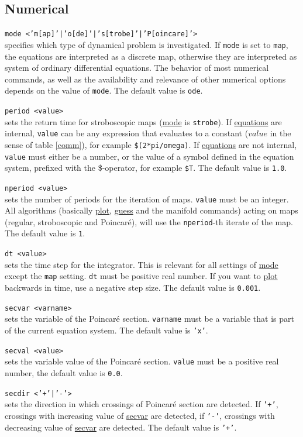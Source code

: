 \documentclass[10pt,a4paper,titlepage]{article}
\newcommand{\opt}[2]{\item{\T{\hypertarget{#1}{#1}\index[index]{#1} #2}}}
\newcommand{\HL}[1]{\hyperlink{#1}{#1}}
\newcommand{\T}[1]{\texttt{#1}}
\begin{document}
\subsection{Numerical}
\begin{description}
\opt{mode}{<'m[ap]'|'o[de]'|'s[trobe]'|'P[oincare]'>}\\ 
specifies which type of dynamical problem is investigated. If \T{mode} is set to \T{map}, the equations are interpreted as a discrete map, otherwise they are interpreted as system of ordinary differential equations. The behavior of most numerical commands, as well as the availability and relevance of other numerical options depends on the value of \T{mode}. The default value is \T{ode}.
\opt{period}{<value>}\\
sets the return time for stroboscopic maps (\HL{mode} is \T{strobe}). If \HL{equations} are internal, \T{value} can be any expression that  evaluates to a constant ($value$ in the sense of table \ref{comm}), for example \T{\$(2*pi/omega)}. If \HL{equations} are not internal, \T{value} must either be a number, or the value of a symbol defined in the equation system, prefixed with the \$-operator, for example \T{\$T}. The default value is \T{1.0}. 
\opt{nperiod}{<value>}\\
sets the number of periods for the iteration of maps. \T{value} must be an integer. All algorithms (basically \HL{plot}, \HL{guess} and the manifold commands) acting on maps (regular, stroboscopic and Poincar\'e), will use the \T{nperiod}-th iterate of the map. The default value is \T{1}.
\opt{dt}{<value>}\\
sets the time step for the integrator. This is relevant for all settings of \HL{mode} except the \T{map} setting. \T{dt} must be positive real number. If you want to \HL{plot} backwards in time, use a negative step size. The default value is \T{0.001}. 
\opt{secvar}{<varname>}\\
sets the variable of the Poincar\'e section. \T{varname} must be a variable that is part of the current equation system. The default value is \T{'x'}.
\opt{secval}{<value>}\\ 
sets the variable value of the Poincar\'e section. \T{value} must be a positive real number, the default value is \T{0.0}.
\opt{secdir}{<'+'|'-'>}\\
sets the direction in which crossings of Poincar\'e section are detected. If \T{'+'}, crossings with increasing value of \HL{secvar} are detected, if \T{'-'}, crossings with decreasing value of \HL{secvar} are detected. The default value is \T{'+'}.

\end{description}
\end{document}
